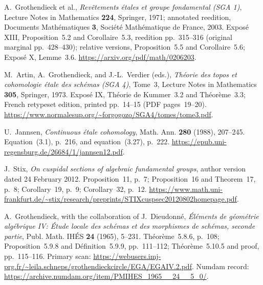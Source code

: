 
A.~Grothendieck et al., \emph{Rev\^etements \'etales et groupe fondamental
(SGA 1)}, Lecture Notes in Mathematics \textbf{224}, Springer, 1971;
annotated reedition, Documents Math\'ematiques \textbf{3},
Soci\'et\'e Math\'ematique de France, 2003.
Expos\'e XIII, Proposition~5.2 and Corollaire~5.3,
reedition pp.~315--316 (original marginal pp.~428--430);
relative versions, Proposition~5.5 and Corollaire~5.6;
Expos\'e X, Lemme~3.6.
\url{https://arxiv.org/pdf/math/0206203}.

M.~Artin, A.~Grothendieck, and J.-L.~Verdier (eds.),
\emph{Th\'eorie des topos et cohomologie \'etale des sch\'emas
(SGA 4)}, Tome~3, Lecture Notes in Mathematics \textbf{305},
Springer, 1973. Expos\'e IX, Th\'eorie de Kummer~3.2 and
Th\'eor\`eme~3.3; French retypeset edition, printed pp.~14--15
(PDF pages~19--20).
\url{https://www.normalesup.org/~forgogozo/SGA4/tomes/tome3.pdf}.

U.~Jannsen, \emph{Continuous \'etale cohomology},
Math. Ann. \textbf{280} (1988), 207--245.
Equation~(3.1), p.~216, and equation~(3.27), p.~222.
\url{https://epub.uni-regensburg.de/26684/1/jannsen12.pdf}.

J.~Stix, \emph{On cuspidal sections of algebraic fundamental groups},
author version dated 24 February 2012.
Proposition~11, p.~7; Proposition~16 and Theorem~17, p.~8;
Corollary~19, p.~9; Corollary~32, p.~12.
\url{https://www.math.uni-frankfurt.de/~stix/research/preprints/STIXcuspsec20120802homepage.pdf}.

A.~Grothendieck, with the collaboration of J.~Dieudonn\'e,
\emph{\'El\'ements de g\'eom\'etrie alg\'ebrique IV:
\'Etude locale des sch\'emas et des morphismes de sch\'emas,
seconde partie}, Publ. Math. IH\'ES \textbf{24} (1965), 5--231.
Th\'eor\`eme~5.8.6, p.~108; Proposition~5.9.8 and
D\'efinition~5.9.9, pp.~111--112;
Th\'eor\`eme~5.10.5 and proof, pp.~115--116.
Primary scan:
\url{https://webusers.imj-prg.fr/~leila.schneps/grothendieckcircle/EGA/EGAIV.2.pdf}.
Numdam record: \url{https://archive.numdam.org/item/PMIHES_1965__24__5_0/}.
